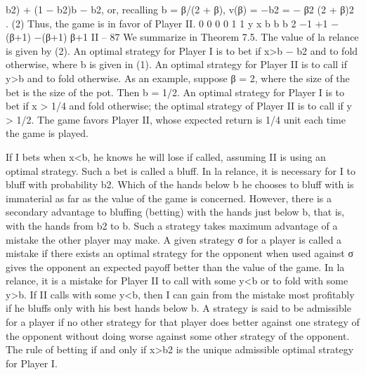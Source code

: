b2) + (1 − b2)b − b2, or, recalling b = β/(2 + β),
v(β) = −b2 = − β2
(2 + β)2 . (2)
Thus, the game is in favor of Player II.
0
0
0
0
1
1
y
x
b
b b 2
−1
+1
−(β+1)
−(β+1)
β+1
II – 87
We summarize in
Theorem 7.5. The value of la relance is given by (2). An optimal strategy for Player I
is to bet if x>b − b2 and to fold otherwise, where b is given in (1). An optimal strategy
for Player II is to call if y>b and to fold otherwise.
As an example, suppose β = 2, where the size of the bet is the size of the pot. Then
b = 1/2. An optimal strategy for Player I is to bet if x > 1/4 and fold otherwise; the
optimal strategy of Player II is to call if y > 1/2. The game favors Player II, whose
expected return is 1/4 unit each time the game is played.

If I bets when x<b, he knows he will lose if called, assuming II is using an optimal
strategy. Such a bet is called a bluff. In la relance, it is necessary for I to bluff with
probability b2. Which of the hands below b he chooses to bluff with is immaterial as far as
the value of the game is concerned. However, there is a secondary advantage to bluffing
(betting) with the hands just below b, that is, with the hands from b2 to b. Such a strategy
takes maximum advantage of a mistake the other player may make.
A given strategy σ for a player is called a mistake if there exists an optimal strategy
for the opponent when used against σ gives the opponent an expected payoff better than
the value of the game. In la relance, it is a mistake for Player II to call with some y<b
or to fold with some y>b. If II calls with some y<b, then I can gain from the mistake
most profitably if he bluffs only with his best hands below b.
A strategy is said to be admissible for a player if no other strategy for that player
does better against one strategy of the opponent without doing worse against some other
strategy of the opponent. The rule of betting if and only if x>b2 is the unique admissible
optimal strategy for Player I.


